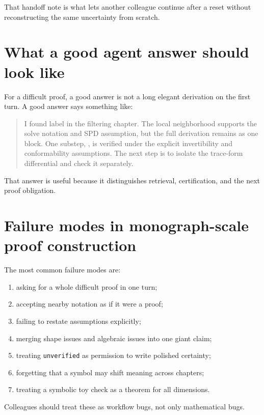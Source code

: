 \documentclass[12pt,a4paper,openany]{book}
\begin{document}
That handoff note is what lets another colleague continue after a reset without
reconstructing the same uncertainty from scratch.

\section*{What a good agent answer should look like}

For a difficult proof, a good answer is not a long elegant derivation on the
first turn. A good answer says something like:

\begin{quote}
I found label  in the filtering
chapter. The local neighborhood supports the solve notation and SPD assumption,
but the full derivation remains  as one block. One substep,
, is verified under the explicit
invertibility and conformability assumptions. The next step is to isolate the
trace-form differential and check it separately.
\end{quote}

That answer is useful because it distinguishes retrieval, certification, and the
next proof obligation.

\section*{Failure modes in monograph-scale proof construction}

The most common failure modes are:

\begin{enumerate}[label=\arabic*.]
  \item asking for a whole difficult proof in one turn;
  \item accepting nearby notation as if it were a proof;
  \item failing to restate assumptions explicitly;
  \item merging shape issues and algebraic issues into one giant claim;
  \item treating \texttt{unverified} as permission to write polished certainty;
  \item forgetting that a symbol may shift meaning across chapters;
  \item treating a symbolic toy check as a theorem for all dimensions.
\end{enumerate}

Colleagues should treat these as workflow bugs, not only mathematical bugs.
\end{document}
